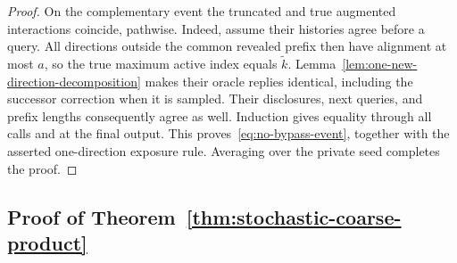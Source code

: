 \documentclass[11pt,a4paper]{article}
\theoremstyle{remark}
\begin{document}
\begin{proof}
On the complementary event the truncated and true augmented interactions
coincide, pathwise.  Indeed, assume their histories agree before a query.
All directions outside the common revealed prefix then have alignment at
most $a$, so the true maximum active index equals $\widetilde k$.
Lemma~\ref{lem:one-new-direction-decomposition} makes their oracle replies
identical, including the successor correction when it is sampled.  Their
disclosures, next queries, and prefix lengths consequently agree as well.
Induction gives equality through all calls and at the final output.  This
proves~\eqref{eq:no-bypass-event}, together with the asserted one-direction
exposure rule.  Averaging over the private seed completes the proof.
\end{proof}

\subsection{Proof of Theorem~\ref{thm:stochastic-coarse-product}}
\end{document}
